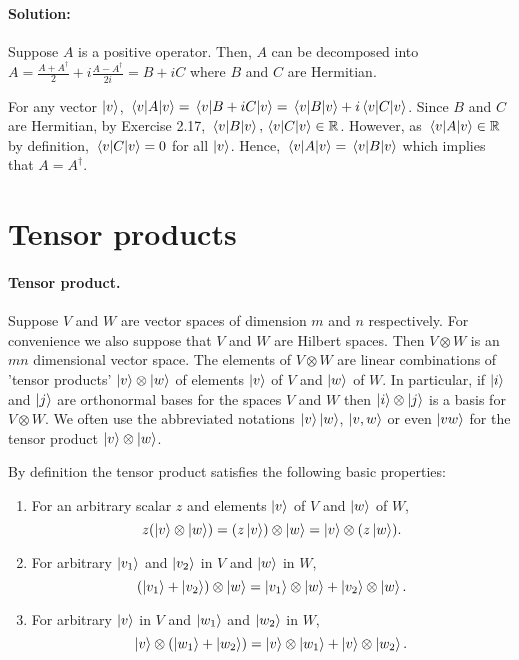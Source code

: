 \paragraph{Solution:} Suppose $A$ is a positive operator. Then, $A$ can be
decomposed into $A = \frac{A + A^\dagger}{2} + i\frac{A - A^\dagger}{2i} = B +
iC$ where $B$ and $C$ are Hermitian.

For any vector $\ket{v}$, $\mel{v}{A}{v} = \mel{v}{B + iC}{v} = \mel{v}{B}{v} +
i\mel{v}{C}{v}$. Since $B$ and $C$ are Hermitian, by Exercise 2.17,
$\mel{v}{B}{v}, \mel{v}{C}{v} \in \mathbb{R}$. However, as $\mel{v}{A}{v} \in
\mathbb{R}$ by definition, $\mel{v}{C}{v} = 0$ for all $\ket{v}$. Hence,
$\mel{v}{A}{v} = \mel{v}{B}{v}$ which implies that $A = A^\dagger$.

\section{Tensor products}

\paragraph{Tensor product.} Suppose $V$ and $W$ are vector spaces of dimension
$m$ and $n$ respectively. For convenience we also suppose that $V$ and $W$ are
Hilbert spaces. Then $V \otimes W$ is an $mn$ dimensional vector space. The
elements of $V \otimes W$ are linear combinations of 'tensor products' $\ket{v}
\otimes \ket{w}$ of elements $\ket{v}$ of $V$ and $\ket{w}$ of $W$. In
particular, if $\ket{i}$ and $\ket{j}$ are orthonormal bases for the spaces $V$
and $W$ then $\ket{i} \otimes \ket{j}$ is a basis for $V \otimes W$. We often
use the abbreviated notations $\ket{v}\ket{w}$, $\ket{v, w}$ or even $\ket{vw}$
for the tensor product $\ket{v} \otimes \ket{w}$.

By definition the tensor product satisfies the following basic properties:
\begin{enumerate}
  \item For an arbitrary scalar $z$ and elements $\ket{v}$ of $V$ and $\ket{w}$
    of $W$, \begin{equation*}
      z(\ket{v} \otimes \ket{w}) = (z\ket{v}) \otimes \ket{w} = \ket{v} \otimes
        (z\ket{w}).
  \end{equation*}
  \item For arbitrary $\ket{v_1}$ and $\ket{v_2}$ in $V$ and $\ket{w}$ in $W$,
    \begin{equation*}
      (\ket{v_1} + \ket{v_2}) \otimes \ket{w} = \ket{v_1} \otimes \ket{w} +
        \ket{v_2} \otimes \ket{w}.
    \end{equation*}
  \item For arbitrary $\ket{v}$ in $V$ and $\ket{w_1}$ and $\ket{w_2}$ in $W$,
    \begin{equation*}
      \ket{v} \otimes (\ket{w_1} + \ket{w_2}) = \ket{v} \otimes \ket{w_1} +
        \ket{v} \otimes \ket{w_2}.
    \end{equation*}
\end{enumerate}

